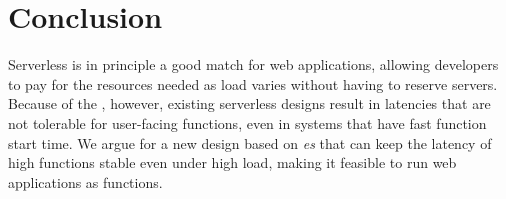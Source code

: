 \section{Conclusion}

Serverless is in principle a good match for web applications, allowing
developers to pay for the resources needed as load varies without having to
reserve servers. Because of the \problem, however, existing serverless designs
result in latencies that are not tolerable for user-facing functions, even in
systems that have fast function start time.  We argue for a new design based on
\emph{\priceclass{}es} that can keep the latency of high \class{} functions
stable even under high load, making it feasible to run web applications as
functions. 
